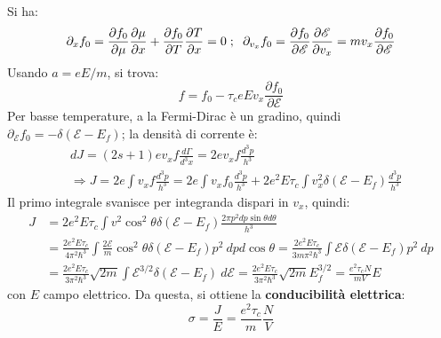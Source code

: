 \documentclass[10pt, a4paper]{scrartcl}
\numberwithin{equation}{subsection}
\theoremstyle{style1}
\begin{document}
Si ha:
\[
	\partial _x f_0 = \frac{\partial f_0}{\partial \mu } \frac{\partial \mu }{\partial x} + \frac{\partial f_0}{\partial T} \frac{\partial T}{\partial x} = 0 \hspace{.1cm} ; \hspace{.2cm} \partial _{v_x} f_0 = \frac{\partial f_0}{\partial \mathscr{E}} \frac{\partial \mathscr{E}}{\partial v_x} = mv_x \frac{\partial f_0}{\partial \mathscr{E}} 
\] 
Usando $a = eE / m$, si trova:
\begin{equation}
	f = f_0- \tau _c e E v_x \frac{\partial f_0}{\partial \mathscr{E}} 
\end{equation}
Per basse temperature, a la Fermi-Dirac \`e un gradino, quindi $\partial _\mathscr{E} f_0 = -\delta  (\mathscr{E}-E_f)$;
la densit\`a di corrente \`e:
\begin{equation}
	\begin{split}
		&dJ = (2s+1) ev_x f \frac{d \Gamma}{d ^3 x}  = 2ev_x f \frac{d^3 p}{h^3}\\
		&\Rightarrow J = 2e \int v_x f \frac{d^3 p}{h^3} = 2e \int v_x f_0 \frac{d^3 p}{h^3} + 2e^2 E \tau _c \int v_x^2 \delta (\mathscr{E}-E_f) \frac{d^3p}{ h^3} 
	\end{split}
\end{equation}
Il primo integrale svanisce per integranda dispari in $v_x$, quindi:
\begin{equation}
	\begin{split}
		J &= 2e^2 E \tau _c \int v^2 \cos^2 \theta  \delta (\mathscr{E} -E_f) \frac{2\pi p ^2 dp \sin \theta  d\theta }{h^3}\\
		  & = \frac{2e^2 E \tau _c }{4\pi^2 \hbar ^3} \int \frac{2\mathscr{E}}{m} \cos^2 \theta \delta (\mathscr{E}-E_f) p^2 \ dp d\cos \theta = \frac{2e^2 E \tau _c}{3 m \pi^2 \hbar ^3} \int \mathscr{E} \delta (\mathscr{E} - E_f) p^2 \ dp\\
		  &= \frac{2 e^2 E \tau _c}{3 \pi ^2 \hbar ^3} \sqrt{ 2m}  \int \mathscr{E }^{3 / 2}  \delta (\mathscr{E}-E_f) \ d\mathscr{E} = \frac{2e^2 E \tau _c}{3 \pi^2 \hbar ^3} \sqrt{2m}  E_f ^{3 / 2} = \frac{e^2 \tau _c N}{mV } E
	\end{split}
\end{equation}
con $E $ campo elettrico. Da questa, si ottiene la \textbf{conducibilit\`a elettrica}:
\begin{equation}
	\sigma  = \frac{J}{E} = \frac{e^2 \tau _c}{m} \frac{N}{V}
\end{equation}
\end{document}
